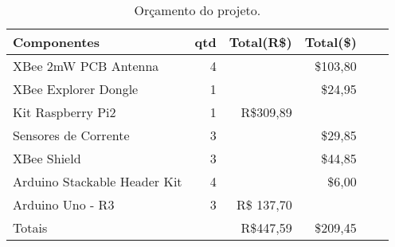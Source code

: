 \begin{table}
\centering
{\renewcommand{\arraystretch}{1.5}
\renewcommand{\tabcolsep}{0.2cm}
\begin{tabular}{|l|r|r|r|r|r|}
\hline
Componentes & qtd & Total(R\$) & Total(\$) \\
\hline
XBee 2mW PCB Antenna & 4 & {} & \$103,80 \\
XBee Explorer Dongle & 1 & {} & \$24,95 \\
Kit Raspberry Pi2 & 1 & R\$309,89 & {} \\
Sensores de Corrente & 3 & {} & \$29,85 \\
XBee Shield & 3 & {} & \$44,85 \\
Arduino Stackable Header Kit & 4 & {} & \$6,00 \\
Arduino Uno - R3 & 3 & R\$ 137,70 & {} \\
\hline
\multicolumn{2}{|l|}{Totais} & R\$447,59 & \$209,45 \\
\hline
\end{tabular}}
\caption{\label{tab:orcamento} Orçamento do projeto.}
\end{table}